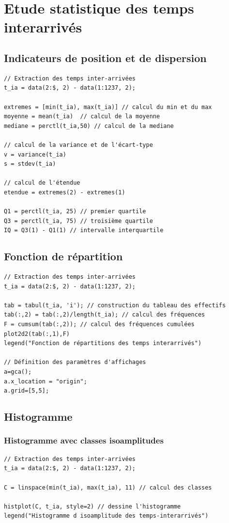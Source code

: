 \documentclass{article}
\begin{document}
\newpage
\appendix

\section{Etude statistique des temps interarrivés}

\subsection{Indicateurs de position et de dispersion}
\begin{verbatim}
// Extraction des temps inter-arrivées
t_ia = data(2:$, 2) - data(1:1237, 2);

extremes = [min(t_ia), max(t_ia)] // calcul du min et du max
moyenne = mean(t_ia)  // calcul de la moyenne
mediane = perctl(t_ia,50) // calcul de la mediane

// calcul de la variance et de l'écart-type
v = variance(t_ia)
s = stdev(t_ia)

// calcul de l'étendue
etendue = extremes(2) - extremes(1)

Q1 = perctl(t_ia, 25) // premier quartile
Q3 = perctl(t_ia, 75) // troisième quartile
IQ = Q3(1) - Q1(1) // intervalle interquartile
\end{verbatim}

\subsection{Fonction de répartition}
\begin{verbatim}
// Extraction des temps inter-arrivées
t_ia = data(2:$, 2) - data(1:1237, 2);

tab = tabul(t_ia, 'i'); // construction du tableau des effectifs
tab(:,2) = tab(:,2)/length(t_ia); // calcul des fréquences
F = cumsum(tab(:,2)); // calcul des fréquences cumulées
plot2d2(tab(:,1),F)
legend("Fonction de répartitions des temps interarrivés")

// Définition des paramètres d'affichages
a=gca();
a.x_location = "origin";
a.grid=[5,5];

\end{verbatim}

\subsection{Histogramme}
\subsubsection{Histogramme avec classes isoamplitudes}
\begin{verbatim}
// Extraction des temps inter-arrivées
t_ia = data(2:$, 2) - data(1:1237, 2);

C = linspace(min(t_ia), max(t_ia), 11) // calcul des classes

histplot(C, t_ia, style=2) // dessine l'histogramme
legend("Histogramme d isoamplitude des temps-interarrivés")
\end{verbatim}
\end{document}
